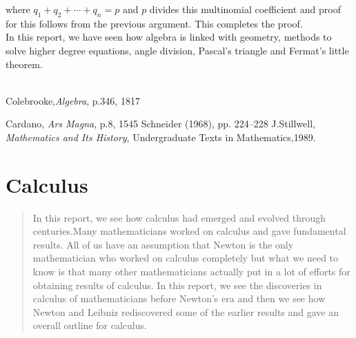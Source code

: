 \documentclass[a4paper,reqno,11pt]{book}
\theoremstyle{plain}%
\theoremstyle{definition}
\begin{document}
where $q_{1}+q_{2}+\cdots+q_{n} = p$ and $p$ divides this multinomial coefficient and proof for this follows from the previous argument. This completes the proof.\\
\indent In this report, we have seen how algebra is linked with geometry, methods to solve higher degree equations, angle division, Pascal's triangle and Fermat's little theorem. \\
\\
\begin{thebibliography}{99}
		
		 Colebrooke,\textit{Algebra}, p.346, 1817
		
		 Cardano, \textit{Ars Magna}, p.8, 1545
   Schneider (1968), pp. 224–228
   J.Stillwell, \textit{Mathematics and Its History}, Undergraduate Texts in Mathematics,1989.
 
		

		
		
	\end{thebibliography}
 \chapter{Calculus}
 \begin{abstract}
	 In this report, we see how calculus had emerged and evolved through centuries.Many mathematicians worked on calculus and gave fundamental results. All of us have an assumption that Newton is the only mathematician who worked on calculus completely but what we need to know is that many other mathematicians actually put in a lot of efforts for obtaining results of calculus. In this report, we see the discoveries in calculus of mathematicians before Newton's era and then we see how Newton and Leibniz rediscovered some of the earlier results and gave an overall outline for calculus.
	\end{abstract}
\end{document}
